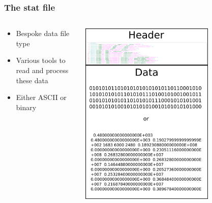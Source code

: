 \documentclass[12pt]{beamer}
\begin{document}
\begin{frame}
    \frametitle{The stat file}
\begin{columns}
\begin{column}{0.6\textwidth}
\begin{itemize}
\item Bespoke data file type
\item Various tools to read and process these data
\item Either ASCII or binary
\end{itemize}
\end{column}
\begin{column}{0.4\textwidth}
\begin{center}
\includegraphics[width=0.7\textwidth]{images/stat_file.png}
\end{center}
\end{column}
\end{columns}
\end{frame}
\end{document}
